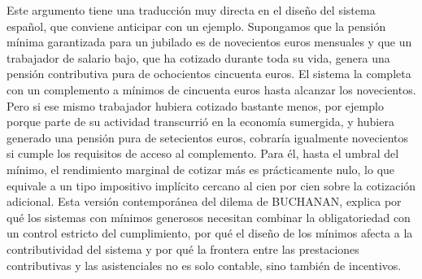 \documentclass[10pt,a4paper]{article}
\begin{document}
Este argumento tiene una traducción muy directa en el diseño del sistema español, que conviene anticipar con un ejemplo. Supongamos que la pensión mínima garantizada para un jubilado es de novecientos euros mensuales y que un trabajador de salario bajo, que ha cotizado durante toda su vida, genera una pensión contributiva pura de ochocientos cincuenta euros. El sistema la completa con un complemento a mínimos de cincuenta euros hasta alcanzar los novecientos. Pero si ese mismo trabajador hubiera cotizado bastante menos, por ejemplo porque parte de su actividad transcurrió en la economía sumergida, y hubiera generado una pensión pura de setecientos euros, cobraría igualmente novecientos si cumple los requisitos de acceso al complemento. Para él, hasta el umbral del mínimo, el rendimiento marginal de cotizar más es prácticamente nulo, lo que equivale a un tipo impositivo implícito cercano al cien por cien sobre la cotización adicional. Esta versión contemporánea del dilema de BUCHANAN, explica por qué los sistemas con mínimos generosos necesitan combinar la obligatoriedad con un control estricto del cumplimiento, por qué el diseño de los mínimos afecta a la contributividad del sistema y por qué la frontera entre las prestaciones contributivas y las asistenciales no es solo contable, sino también de incentivos.
\end{document}
